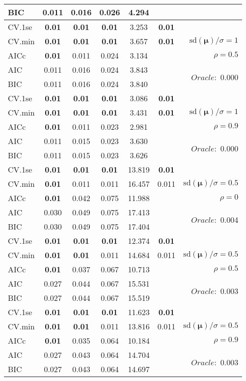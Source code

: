 \begin{table}
\begin{center}
\begin{tabular}{l*{5}{c}|r}
BIC & 0.011 & 0.016 & 0.026 & 4.294 & &  \\
 \hline 
CV.1se & {\bf 0.01} & {\bf 0.01} & {\bf 0.01} & 3.253 & {\bf 0.01} & \\
CV.min & {\bf 0.01} & {\bf 0.01} & {\bf 0.01} & 3.657 & {\bf 0.01} &  $\mathrm{sd}(\mathbf{\mu})/\sigma=1$ \\
AICc & {\bf 0.01} & 0.011 & 0.024 & 3.134 & & $\rho=0.5$ \\
AIC & 0.011 & 0.016 & 0.024 & 3.843 & &  \multirow{2}{*}{$Oracle: $ 0.000} \\
BIC & 0.011 & 0.016 & 0.024 & 3.840 & &  \\
 \hline 
CV.1se & {\bf 0.01} & {\bf 0.01} & {\bf 0.01} & 3.086 & {\bf 0.01} & \\
CV.min & {\bf 0.01} & {\bf 0.01} & {\bf 0.01} & 3.431 & {\bf 0.01} &  $\mathrm{sd}(\mathbf{\mu})/\sigma=1$ \\
AICc & {\bf 0.01} & 0.011 & 0.023 & 2.981 & & $\rho=0.9$ \\
AIC & 0.011 & 0.015 & 0.023 & 3.630 & &  \multirow{2}{*}{$Oracle: $ 0.000} \\
BIC & 0.011 & 0.015 & 0.023 & 3.626 & &  \\
 \hline 
CV.1se & {\bf 0.01} & {\bf 0.01} & {\bf 0.01} & 13.819 & {\bf 0.01} & \\
CV.min & {\bf 0.01} & 0.011 & 0.011 & 16.457 & 0.011 &  $\mathrm{sd}(\mathbf{\mu})/\sigma=0.5$ \\
AICc & {\bf 0.01} & 0.042 & 0.075 & 11.988 & & $\rho=0$ \\
AIC & 0.030 & 0.049 & 0.075 & 17.413 & &  \multirow{2}{*}{$Oracle: $ 0.004} \\
BIC & 0.030 & 0.049 & 0.075 & 17.404 & &  \\
 \hline 
CV.1se & {\bf 0.01} & {\bf 0.01} & {\bf 0.01} & 12.374 & {\bf 0.01} & \\
CV.min & {\bf 0.01} & {\bf 0.01} & 0.011 & 14.684 & 0.011 &  $\mathrm{sd}(\mathbf{\mu})/\sigma=0.5$ \\
AICc & {\bf 0.01} & 0.037 & 0.067 & 10.713 & & $\rho=0.5$ \\
AIC & 0.027 & 0.044 & 0.067 & 15.531 & &  \multirow{2}{*}{$Oracle: $ 0.003} \\
BIC & 0.027 & 0.044 & 0.067 & 15.519 & &  \\
 \hline 
CV.1se & {\bf 0.01} & {\bf 0.01} & {\bf 0.01} & 11.623 & {\bf 0.01} & \\
CV.min & {\bf 0.01} & {\bf 0.01} & 0.011 & 13.816 & 0.011 &  $\mathrm{sd}(\mathbf{\mu})/\sigma=0.5$ \\
AICc & {\bf 0.01} & 0.035 & 0.064 & 10.184 & & $\rho=0.9$ \\
AIC & 0.027 & 0.043 & 0.064 & 14.704 & &  \multirow{2}{*}{$Oracle: $ 0.003} \\
BIC & 0.027 & 0.043 & 0.064 & 14.697 & &  \\
 \hline 
\end{tabular}
\end{center}
\vspace{-1cm}
\end{table}




